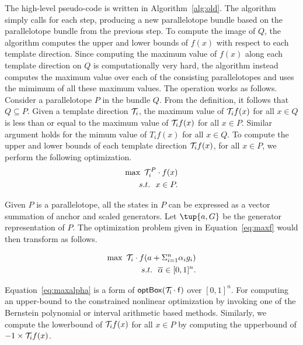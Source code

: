 The high-level pseudo-code is written in Algorithm~\ref{alg:old}.
%
The algorithm simply calls \tbundle for each step, producing a new parallelotope bundle based on the parallelotope bundle from the previous step.
%
To compute the image of $Q$, the algorithm computes the upper and lower bounds of $f(x)$ with respect to each template direction.
%
Since computing the maximum value of $f(x)$ along each template direction on $Q$ is computationally very hard, the algorithm instead computes the maximum value over each of the consisting parallelotopes and uses the mimimum of all these maximum values.
%
The \tbundle operation works as follows.
%
Consider a parallelotope $P$ in the bundle $Q$.
%
From the definition, it follows that $Q \subseteq P$.
%
Given a template direction ${\cal T}_i$, the maximum value of ${\cal T}_{i} f(x)$ for all $x \in Q$ is less than or equal to the maximum value of ${\cal T}_{i} f(x)$ for all $x \in P$.
%
Similar argument holds for the mimum value of $T_{i} f(x)$ for all $x \in Q$.
%
%
%
%
To compute the upper and lower bounds of each template direction ${\cal T}_{i} f(x)$, for all $x \in P$, we perform the following optimization.
%
\begin{eqnarray}
  \max ~ {\cal T}_i^{P} \cdot f(x) \label{eq:maxf}\\
  s.t. ~~ x \in P.\nonumber
\end{eqnarray}

Given $P$ is a parallelotope, all the states in $P$ can be expressed as a vector summation of anchor and scaled generators.
%
Let  $\tup{a, G}$ be the generator representation of $P$.
%
The optimization problem given in Equation~\ref{eq:maxf} would then transform as follows.

\begin{eqnarray}
  \max ~ {\cal T}_i \cdot f(a + \Sigma_{i=1}^{n} \alpha_i g_i) \label{eq:maxalpha}\\
  s.t. ~~ \overline\alpha \in [0,1]^{n}.\nonumber
\end{eqnarray}

Equation~\ref{eq:maxalpha} is a form of $\mathsf{optBox({\cal T}_{i} \cdot f)}$ over $[0,1]^n$.
%
For computing an upper-bound to the constrained nonlinear optimization by invoking one of the Bernstein polynomial or interval arithmetic based methods.
%
Similarly, we compute the lowerbound of ${\cal T}_{i}f(x)$ for all $x \in P$ by computing the upperbound of $-1 \times {\cal T}_{i}f(x)$.
%

